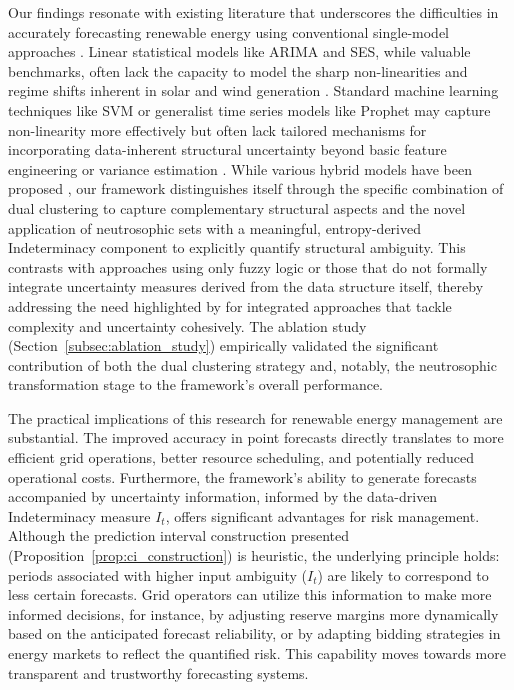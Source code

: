 \documentclass[review,3p,times]{elsarticle}
\begin{document}
Our findings resonate with existing literature that underscores the difficulties in accurately forecasting renewable energy using conventional single-model approaches \cite{sorensen2023recent, hong2020energy}. Linear statistical models like ARIMA and SES, while valuable benchmarks, often lack the capacity to model the sharp non-linearities and regime shifts inherent in solar and wind generation \cite{wu2021ensemble}. Standard machine learning techniques like SVM or generalist time series models like Prophet may capture non-linearity more effectively but often lack tailored mechanisms for incorporating data-inherent structural uncertainty beyond basic feature engineering or variance estimation \cite{mahmud2021machine, ibrahim2022machine}. While various hybrid models have been proposed \cite{moosavi2019learning, lin2018multi}, our framework distinguishes itself through the specific combination of dual clustering to capture complementary structural aspects and the novel application of neutrosophic sets with a meaningful, entropy-derived Indeterminacy component to explicitly quantify structural ambiguity. This contrasts with approaches using only fuzzy logic or those that do not formally integrate uncertainty measures derived from the data structure itself, thereby addressing the need highlighted by \cite{rothleder2017case} for integrated approaches that tackle complexity and uncertainty cohesively. The ablation study (Section~\ref{subsec:ablation_study}) empirically validated the significant contribution of both the dual clustering strategy and, notably, the neutrosophic transformation stage to the framework's overall performance.

The practical implications of this research for renewable energy management are substantial. The improved accuracy in point forecasts directly translates to more efficient grid operations, better resource scheduling, and potentially reduced operational costs. Furthermore, the framework's ability to generate forecasts accompanied by uncertainty information, informed by the data-driven Indeterminacy measure $I_t$, offers significant advantages for risk management. Although the prediction interval construction presented (Proposition~\ref{prop:ci_construction}) is heuristic, the underlying principle holds: periods associated with higher input ambiguity ($I_t$) are likely to correspond to less certain forecasts. Grid operators can utilize this information to make more informed decisions, for instance, by adjusting reserve margins more dynamically based on the anticipated forecast reliability, or by adapting bidding strategies in energy markets to reflect the quantified risk. This capability moves towards more transparent and trustworthy forecasting systems.
\end{document}
